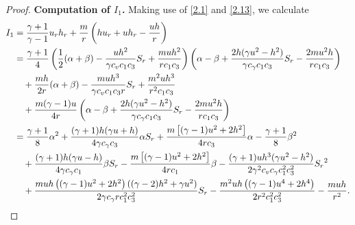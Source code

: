 \documentclass[11pt,reqno]{article}
\numberwithin{equation}{section}
\begin{document}
\begin{proof}
\noindent\textbf{Computation of $I_1$.}
Making use of \eqref{2.1} and \eqref{2.13}, we calculate
\begin{align}
I_1 &=\frac{\gamma+1}{\gamma-1}u_rh_r+\frac{m}{r}\left(hu_r+uh_r-\frac{uh}{r}\right)\nonumber\\
&=\frac{\gamma+1}{4}\left( \frac12(\alpha+\beta)-\frac{uh^2}{\gamma c_v c_1c_3}S_r +\frac{muh^2}{r c_1 c_3} \right) \left( \alpha-\beta+\frac{2h(\gamma u^2-h^2)}{\gamma c_\gamma c_1c_3}S_r-\frac{2m u^2h}{r c_1 c_3} \right) \nonumber\\
&\quad + \frac{mh}{2r}(\alpha+\beta)-\frac{muh^3}{\gamma c_v c_1c_3 r}S_r + \frac{m^2 u h^3}{r^2 c_1 c_3} \nonumber\\
&\quad+ \frac{m(\gamma-1)u}{4r} \left( \alpha-\beta+\frac{2h(\gamma u^2-h^2)}{\gamma c_\gamma c_1c_3}S_r-\frac{2m u^2h}{r c_1 c_3} \right) \nonumber\\
&=\frac{\gamma + 1}{8}\alpha^2 + \frac{(\gamma + 1)h(\gamma u + h)}{4\gamma c_{\gamma}  c_3}\alpha S_r + \frac{m\left[ (\gamma - 1)u^2 +2 h^2 \right]}{4r c_3}\alpha - \frac{\gamma + 1}{8}\beta^2
    \nonumber\\
&\quad+ \frac{(\gamma + 1)h(\gamma u - h)}{4\gamma c_{\gamma}  c_1}\beta S_r - \frac{m\left[ (\gamma - 1)u^2 +2 h^2 \right]}{4r c_1}\beta - \frac{(\gamma + 1)uh^3(\gamma u^2 - h^2)}{2 \gamma^2 c_v c_{\gamma} c_1^2 c_3^2}{S_r}^2 \nonumber\\
&\quad+ \frac{muh\left( (\gamma - 1)u^2 +2 h^2 \right)((\gamma - 2)h^2 + \gamma u^2)}{2 \gamma c_{\gamma} r c_1^2 c_3^2}S_r -\frac{m^2 uh \left( (\gamma - 1)u^4 + 2h^4 \right)}{2r^2 c_1^2 c_3^2} - \frac{muh}{r^2}. \notag
\end{align}


\end{proof}
\end{document}
